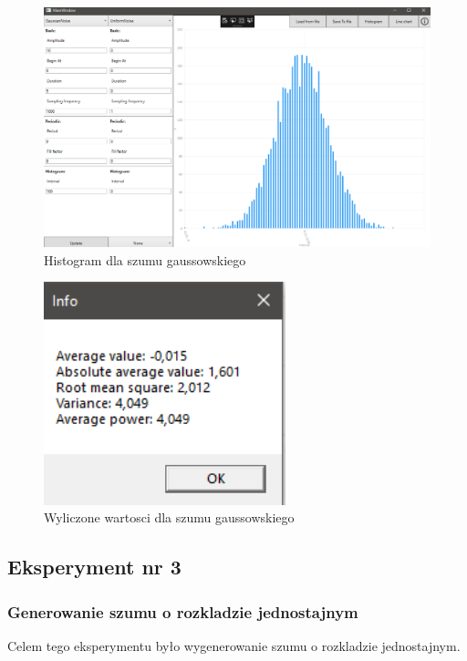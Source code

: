 \documentclass[12pt]{article}
\begin{document}
\begin{figure}[H]
 \centering
 \includegraphics[width=14cm]{images/gauss1hist.PNG}
 \vspace{-0.3cm}
 \caption{Histogram dla szumu gaussowskiego}
 \label{gui}
\end{figure}

\begin{figure}[H]
 \centering
 \includegraphics[width=7cm]{images/gauss1info.PNG}
 \vspace{-0.3cm}
 \caption{Wyliczone wartosci dla szumu gaussowskiego}
 \label{gui}
\end{figure}



\subsection{Eksperyment nr 3 }
\subsubsection{Generowanie szumu o rozkladzie jednostajnym}
Celem tego eksperymentu było wygenerowanie szumu o rozkladzie jednostajnym.
\end{document}
